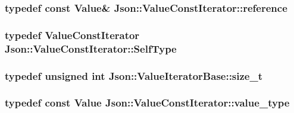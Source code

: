 \subsubsection[{\texorpdfstring{reference}{reference}}]{\setlength{\rightskip}{0pt plus 5cm}typedef const {\bf Value}\& {\bf Json\+::\+Value\+Const\+Iterator\+::reference}}\hypertarget{classJson_1_1ValueConstIterator_aa9b05c6a37cd352ea1ee6e13b816f709}{}\label{classJson_1_1ValueConstIterator_aa9b05c6a37cd352ea1ee6e13b816f709}
\subsubsection[{\texorpdfstring{Self\+Type}{SelfType}}]{\setlength{\rightskip}{0pt plus 5cm}typedef {\bf Value\+Const\+Iterator} {\bf Json\+::\+Value\+Const\+Iterator\+::\+Self\+Type}}\hypertarget{classJson_1_1ValueConstIterator_a0c2e33e7eb5a80dd8709fb28ece83933}{}\label{classJson_1_1ValueConstIterator_a0c2e33e7eb5a80dd8709fb28ece83933}
\subsubsection[{\texorpdfstring{size\+\_\+t}{size_t}}]{\setlength{\rightskip}{0pt plus 5cm}typedef unsigned int {\bf Json\+::\+Value\+Iterator\+Base\+::size\+\_\+t}\hspace{0.3cm}{\ttfamily [inherited]}}\hypertarget{classJson_1_1ValueIteratorBase_a9d3a3c7ce5cdefe23cb486239cf07bb5}{}\label{classJson_1_1ValueIteratorBase_a9d3a3c7ce5cdefe23cb486239cf07bb5}
\subsubsection[{\texorpdfstring{value\+\_\+type}{value_type}}]{\setlength{\rightskip}{0pt plus 5cm}typedef const {\bf Value} {\bf Json\+::\+Value\+Const\+Iterator\+::value\+\_\+type}}\hypertarget{classJson_1_1ValueConstIterator_aa5f1707dcef4bfe73e23ddc14dbe760d}{}\label{classJson_1_1ValueConstIterator_aa5f1707dcef4bfe73e23ddc14dbe760d}


